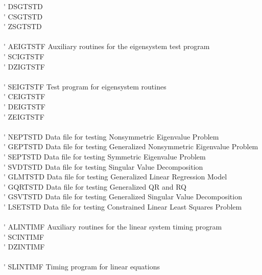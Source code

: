 \begin{tabbing}
 \> \titem \' \> DSGTSTD \> \\
 \> \titem \' \> CSGTSTD \> \\
 \> \titem \' \> ZSGTSTD \> \\
\vspace{0.1ex} \\
 \> \titem \' \> AEIGTSTF\> Auxiliary routines for the eigensystem test program \\
 \> \titem \' \> SCIGTSTF\> \\
 \> \titem \' \> DZIGTSTF\> \\
\vspace{0.1ex} \\
 \> \titem \' \> SEIGTSTF\> Test program for eigensystem routines \\
 \> \titem \' \> CEIGTSTF \> \\
 \> \titem \' \> DEIGTSTF \> \\
 \> \titem \' \> ZEIGTSTF \> \\
\vspace{0.1ex} \\
 \> \titem \' \> NEPTSTD \> Data file for testing Nonsymmetric Eigenvalue Problem \\
 \> \titem \' \> GEPTSTD \> Data file for testing Generalized Nonsymmetric Eigenvalue Problem \\
 \> \titem \' \> SEPTSTD \> Data file for testing Symmetric Eigenvalue Problem \\
 \> \titem \' \> SVDTSTD \> Data file for testing Singular Value Decomposition \\
 \> \titem \' \> GLMTSTD \> Data file for testing Generalized Linear Regression Model \\
 \> \titem \' \> GQRTSTD \> Data file for testing Generalized QR and RQ \\
 \> \titem \' \> GSVTSTD \> Data file for testing Generalized Singular Value Decomposition \\
 \> \titem \' \> LSETSTD \> Data file for testing Constrained Linear Least Squares Problem \\
\vspace{0.1ex} \\
 \> \titem \' \> ALINTIMF\> Auxiliary routines for the linear system timing program \\
 \> \titem \' \> SCINTIMF\> \\
 \> \titem \' \> DZINTIMF\> \\
\vspace{0.1ex} \\
 \> \titem \' \> SLINTIMF\> Timing program for linear equations \\

\end{tabbing}
